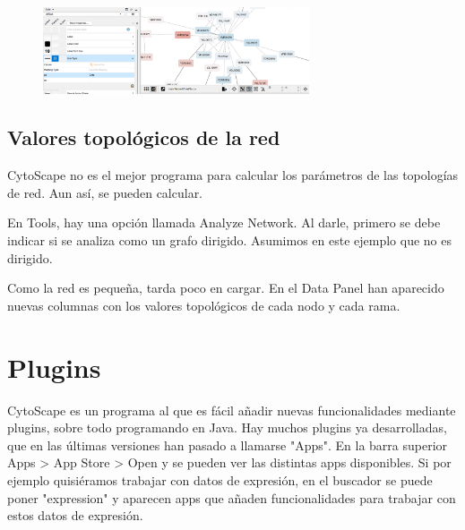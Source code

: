 \documentclass[nochap]{config/ejercicios}
\begin{document}
\begin{figure}[h]
\centering
\includegraphics[width = 0.7\textwidth]{figs/style-edgeline.png}
\end{figure}

\subsection{Valores topológicos de la red}
CytoScape no es el mejor programa para calcular los parámetros de las topologías de red. Aun así, se pueden calcular. 

En Tools, hay una opción llamada Analyze Network. Al darle, primero se debe indicar si se analiza como un grafo dirigido. Asumimos en este ejemplo que no es dirigido. 

Como la red es pequeña, tarda poco en cargar. En el Data Panel han aparecido nuevas columnas con los valores topológicos de cada nodo y cada rama. 

\section{Plugins}
CytoScape es un programa al que es fácil añadir nuevas funcionalidades mediante plugins, sobre todo programando en Java. Hay muchos plugins ya desarrolladas, que en las últimas versiones han pasado a llamarse "Apps". En la barra superior Apps > App Store > Open y se pueden ver las distintas apps disponibles. Si por ejemplo quisiéramos trabajar con datos de expresión, en el buscador se puede poner "expression" y aparecen apps que añaden funcionalidades para trabajar con estos datos de expresión.
\end{document}
